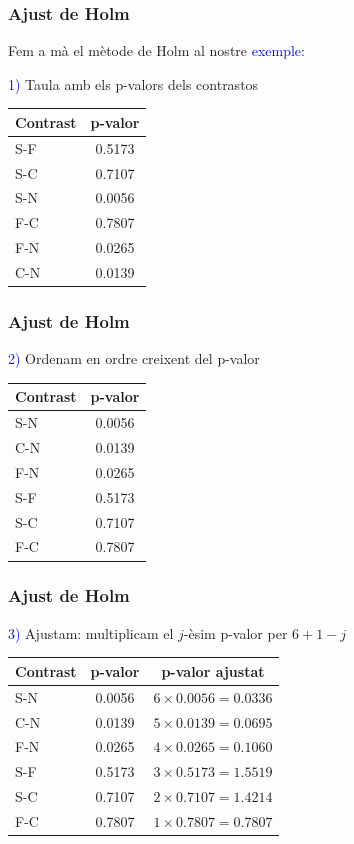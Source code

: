 \documentclass[12pt,t]{beamer}
\newcommand{\blue}[1]{\textcolor{blue}{#1}}
\theoremstyle{plain}
\theoremstyle{definition}
\begin{document}
\begin{frame}
\frametitle{Ajust de Holm}


Fem a mà el mètode de Holm al nostre \blue{exemple}:\medskip

\blue{1)} Taula amb els p-valors dels contrastos

\begin{center}
\begin{tabular}{l|c}
Contrast & p-valor \\ \hline
S-F & 0.5173\\
S-C & 0.7107\\
S-N & 0.0056\\
F-C &0.7807\\
F-N & 0.0265\\
C-N & 0.0139
\end{tabular}
\end{center}

\end{frame}


\begin{frame}
\frametitle{Ajust de Holm}


\blue{2)} Ordenam en ordre creixent del p-valor

\begin{center}
\begin{tabular}{l|c}
Contrast & p-valor \\ \hline
S-N & 0.0056\\
C-N & 0.0139\\
F-N & 0.0265\\
S-F & 0.5173\\
S-C & 0.7107\\
F-C &0.7807\\
\end{tabular}
\end{center}

\end{frame}


\begin{frame}
\frametitle{Ajust de Holm}

\blue{3)} Ajustam: multiplicam el $j$-èsim p-valor per $6+1-j$

\begin{center}
\begin{tabular}{l|cc}
Contrast & p-valor & p-valor ajustat\\ \hline
S-N & 0.0056 & $6\times 0.0056=0.0336 $\\
C-N & 0.0139& $5\times 0.0139=0.0695 $\\
F-N & 0.0265& $4\times 0.0265=0.1060 $\\
S-F & 0.5173& $3\times 0.5173=1.5519 $\\
S-C & 0.7107& $2\times 0.7107=1.4214 $\\
F-C &0.7807& $1\times 0.7807=0.7807$\\
\end{tabular}
\end{center}
\end{frame}
\end{document}
